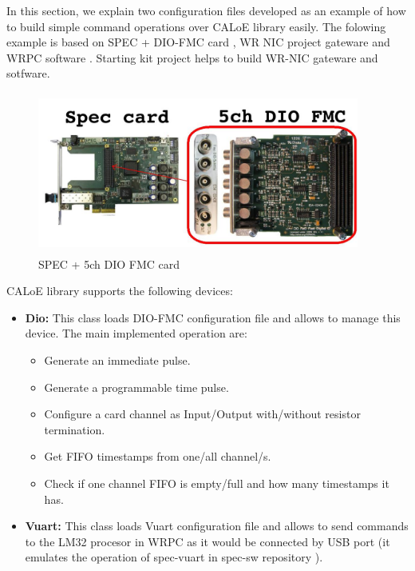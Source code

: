 In this section, we explain two configuration files developed as an example of how to build simple command operations over CALoE library easily. 
The folowing example is based on SPEC \cite{Spec-board} + DIO-FMC card \cite{dio-fmc-repo}, WR NIC \cite{WR-nic} project gateware and WRPC software \cite{WRPCSW-repo}.
Starting kit project \cite{WR-starting-kit} helps to build WR-NIC gateware and sotfware. 

\begin{figure}[H]
\centering
\includegraphics[width=400px,height=200px]{img/spec_dio.jpg}
\caption{SPEC + 5ch DIO FMC card}
\label{spec_dio_fmc_img}
\end{figure}

CALoE library supports the following devices:

\begin{itemize}
 \item {\textbf{Dio:} This class loads DIO-FMC configuration file and allows to manage this device. The main implemented operation are:}
 \begin{itemize}
      \item{Generate an immediate pulse.}
      \item{Generate a programmable time pulse.}
      \item{Configure a card channel as Input/Output with/without resistor termination.}
      \item{Get FIFO timestamps from one/all channel/s.}
      \item{Check if one channel FIFO is empty/full and how many timestamps it has.}
 \end{itemize}
 \item {\textbf{Vuart:} This class loads Vuart configuration file and allows to send commands to the LM32 procesor in WRPC as it would be connected by USB port (it emulates the operation of spec-vuart in spec-sw repository \cite{SPECSW-repo}).}
\end{itemize}

